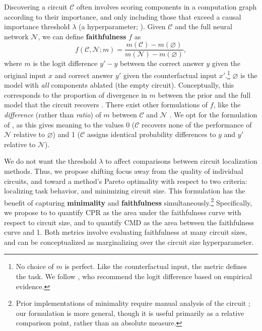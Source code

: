 \documentclass{article}
\theoremstyle{plain}
\theoremstyle{definition}
\theoremstyle{remark}
\newcommand{\arxiv}[1]{#1}
\begin{document}
Discovering a circuit $\mathcal{C}$ often involves scoring components in a computation graph according to their importance, and only including those that exceed a causal importance threshold $\lambda$ (a hyperparameter; \citealp{conmy2023towards,marks2024sparsefeaturecircuitsdiscovering}). Given $\mathcal{C}$ and the full neural network $\mathcal{N}$, we can define \textbf{faithfulness} $f$ as
\begin{equation}
    f(\mathcal{C}, \mathcal{N}; m) = \frac{m(\mathcal{C}) - m(\varnothing)}{m(\mathcal{N}) - m(\varnothing)},
    \label{eq:f}
\end{equation}
where $m$ is the logit difference $y' - y$ between the correct answer $y$ given the original input $x$ and correct answer $y'$ given the counterfactual input $x'$.\footnote{No choice of $m$ is perfect. Like the counterfactual input, the metric defines the task. We follow \citet{zhang2024towards}, who recommend the logit difference based on empirical evidence.}
$\varnothing$ is the model with \emph{all} components ablated (the empty circuit).
Conceptually, this corresponds to the proportion of divergence in $m$ between the prior and the full model that the circuit recovers \citep{marks2024sparsefeaturecircuitsdiscovering}. There exist other formulations of $f$, like the \emph{difference} (rather than \emph{ratio}) of $m$ between $\mathcal{C}$ and $\mathcal{N}$ \citep{wang2022interpretability}. We opt for the formulation of \citet{marks2024sparsefeaturecircuitsdiscovering}, as this gives meaning to the values 0 ($\mathcal{C}$ recovers none of the performance of $\mathcal{N}$ relative to $\varnothing$) and 1 ($\mathcal{C}$ assigns identical probability differences to $y$ and $y'$ relative to $\mathcal{N}$).

We do not want the threshold $\lambda$ to affect comparisons between circuit localization methods. Thus, we propose shifting focus away from the quality of individual circuits, and toward a method's Pareto optimality with respect to two criteria: localizing task behavior, and minimizing circuit size. \arxiv{This formulation has the benefit of capturing \textbf{minimality} and \textbf{faithfulness} simultaneously.}\footnote{Prior implementations of minimality require manual analysis of the circuit \citep{wang2022interpretability}; our formulation is more general, though it is useful primarily as a relative comparison point, rather than an absolute measure.} Specifically, we propose to to quantify \textsf{CPR} as the area under the faithfulness curve with respect to circuit size, and to quantify \textsf{CMD} as the area between the faithfulness curve and 1.
Both metrics involve evaluating faithfulness at many circuit sizes, and can be conceptualized as marginalizing over the circuit size hyperparameter.
\end{document}
